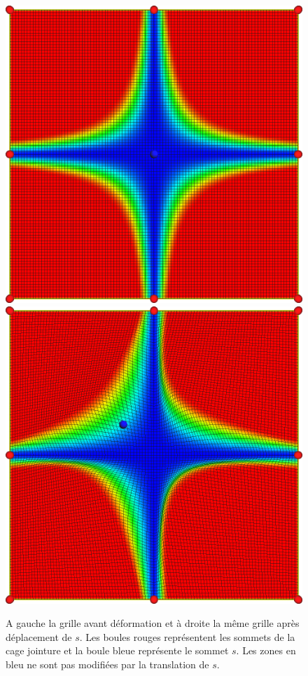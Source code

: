 \begin{figure}[h]
  \begin{center}
    \includegraphics[scale=0.35]{starCage-jointure}
    \includegraphics[scale=0.35]{starCage-jointure-deformation}
    \caption{ A gauche la grille avant déformation et à droite la même
      grille après déplacement de $s$. Les boules rouges représentent
      les sommets de la cage jointure et la boule bleue représente le
      sommet $s$. Les zones en bleu ne sont pas modifiées par la
      translation de $s$.}
    \label{MELjoi}
  \end{center}
\end{figure}

